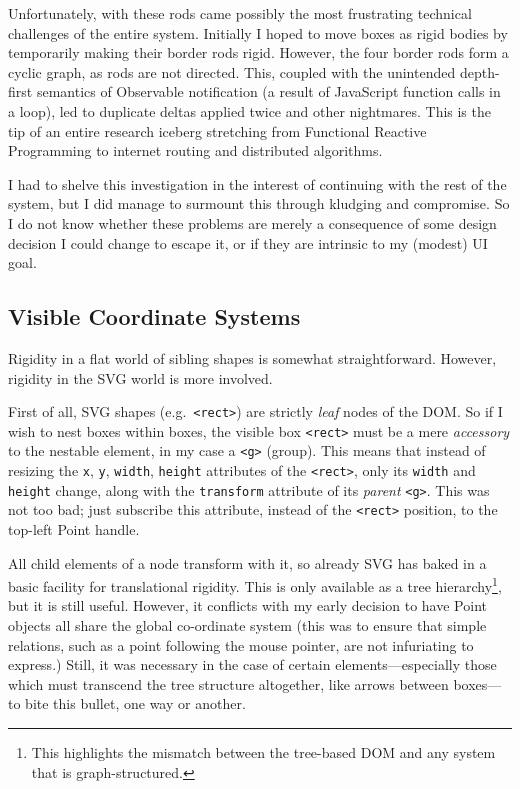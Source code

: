 Unfortunately, with these rods came possibly the most frustrating
technical challenges of the entire system. Initially I hoped to move
boxes as rigid bodies by temporarily making their border rods rigid.
However, the four border rods form a cyclic graph, as rods are not
directed. This, coupled with the unintended depth-first semantics of
Observable notification (a result of JavaScript function calls in a
loop), led to duplicate deltas applied twice and other nightmares. This
is the tip of an entire research iceberg stretching from Functional
Reactive Programming to internet routing and distributed algorithms.

I had to shelve this investigation in the interest of continuing with
the rest of the system, but I did manage to surmount this through
kludging and compromise. So I do not know whether these problems are
merely a consequence of some design decision I could change to escape
it, or if they are intrinsic to my (modest) UI goal.

\hypertarget{visible-coordinate-systems}{%
\subsection{Visible Coordinate
Systems}\label{visible-coordinate-systems}}

Rigidity in a flat world of sibling shapes is somewhat straightforward.
However, rigidity in the SVG world is more involved.

First of all, SVG shapes (e.g.~\texttt{\textless{}rect\textgreater{}})
are strictly \emph{leaf} nodes of the DOM. So if I wish to nest boxes
within boxes, the visible box \texttt{\textless{}rect\textgreater{}}
must be a mere \emph{accessory} to the nestable element, in my case a
\texttt{\textless{}g\textgreater{}} (group). This means that instead of
resizing the \texttt{x}, \texttt{y}, \texttt{width}, \texttt{height}
attributes of the \texttt{\textless{}rect\textgreater{}}, only its
\texttt{width} and \texttt{height} change, along with the
\texttt{transform} attribute of its \emph{parent}
\texttt{\textless{}g\textgreater{}}. This was not too bad; just
subscribe this attribute, instead of the
\texttt{\textless{}rect\textgreater{}} position, to the top-left Point
handle.

All child elements of a node transform with it, so already SVG has baked
in a basic facility for translational rigidity. This is only available
as a tree hierarchy\footnote{This highlights the mismatch between the
  tree-based DOM and any system that is graph-structured.}, but it is
still useful. However, it conflicts with my early decision to have Point
objects all share the global co-ordinate system (this was to ensure that
simple relations, such as a point following the mouse pointer, are not
infuriating to express.) Still, it was necessary in the case of certain
elements---especially those which must transcend the tree structure
altogether, like arrows between boxes---to bite this bullet, one way or
another.

